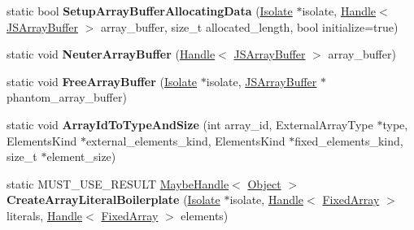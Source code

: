 \begin{DoxyCompactItemize}
\item 
\hypertarget{classv8_1_1internal_1_1_runtime_afb484935f1723efafb7d9f810c4761bd}{}static bool {\bfseries Setup\+Array\+Buffer\+Allocating\+Data} (\hyperlink{classv8_1_1internal_1_1_isolate}{Isolate} $\ast$isolate, \hyperlink{classv8_1_1internal_1_1_handle}{Handle}$<$ \hyperlink{classv8_1_1internal_1_1_j_s_array_buffer}{J\+S\+Array\+Buffer} $>$ array\+\_\+buffer, size\+\_\+t allocated\+\_\+length, bool initialize=true)\label{classv8_1_1internal_1_1_runtime_afb484935f1723efafb7d9f810c4761bd}

\item 
\hypertarget{classv8_1_1internal_1_1_runtime_a5e15fbac36ba1d59a1938008c3c0cc44}{}static void {\bfseries Neuter\+Array\+Buffer} (\hyperlink{classv8_1_1internal_1_1_handle}{Handle}$<$ \hyperlink{classv8_1_1internal_1_1_j_s_array_buffer}{J\+S\+Array\+Buffer} $>$ array\+\_\+buffer)\label{classv8_1_1internal_1_1_runtime_a5e15fbac36ba1d59a1938008c3c0cc44}

\item 
\hypertarget{classv8_1_1internal_1_1_runtime_af6760883c7a1669e2d5789a280100149}{}static void {\bfseries Free\+Array\+Buffer} (\hyperlink{classv8_1_1internal_1_1_isolate}{Isolate} $\ast$isolate, \hyperlink{classv8_1_1internal_1_1_j_s_array_buffer}{J\+S\+Array\+Buffer} $\ast$phantom\+\_\+array\+\_\+buffer)\label{classv8_1_1internal_1_1_runtime_af6760883c7a1669e2d5789a280100149}

\item 
\hypertarget{classv8_1_1internal_1_1_runtime_abee83744b60b0be92601be0cbd012039}{}static void {\bfseries Array\+Id\+To\+Type\+And\+Size} (int array\+\_\+id, External\+Array\+Type $\ast$type, Elements\+Kind $\ast$external\+\_\+elements\+\_\+kind, Elements\+Kind $\ast$fixed\+\_\+elements\+\_\+kind, size\+\_\+t $\ast$element\+\_\+size)\label{classv8_1_1internal_1_1_runtime_abee83744b60b0be92601be0cbd012039}

\item 
\hypertarget{classv8_1_1internal_1_1_runtime_ae721d583f1ba673e504144347c94c146}{}static M\+U\+S\+T\+\_\+\+U\+S\+E\+\_\+\+R\+E\+S\+U\+L\+T \hyperlink{classv8_1_1internal_1_1_maybe_handle}{Maybe\+Handle}$<$ \hyperlink{classv8_1_1internal_1_1_object}{Object} $>$ {\bfseries Create\+Array\+Literal\+Boilerplate} (\hyperlink{classv8_1_1internal_1_1_isolate}{Isolate} $\ast$isolate, \hyperlink{classv8_1_1internal_1_1_handle}{Handle}$<$ \hyperlink{classv8_1_1internal_1_1_fixed_array}{Fixed\+Array} $>$ literals, \hyperlink{classv8_1_1internal_1_1_handle}{Handle}$<$ \hyperlink{classv8_1_1internal_1_1_fixed_array}{Fixed\+Array} $>$ elements)\label{classv8_1_1internal_1_1_runtime_ae721d583f1ba673e504144347c94c146}

\end{DoxyCompactItemize}
